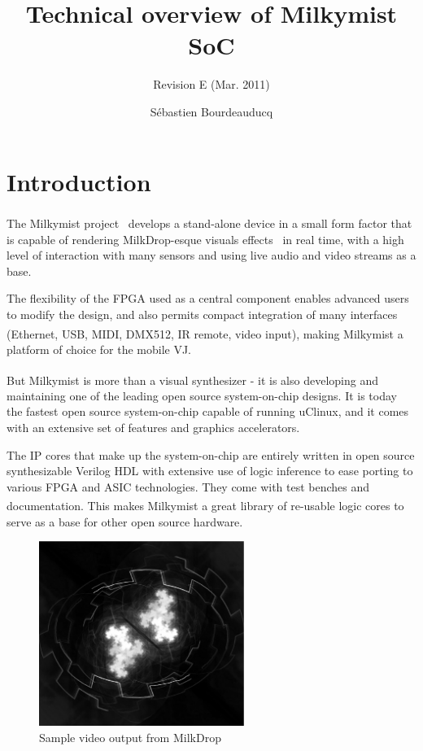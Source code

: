 \documentclass[a4paper,11pt,twocolumn]{paper}
\title{Technical overview of Milkymist SoC}
\subtitle{Revision E (Mar. 2011)}
\author{S\'ebastien Bourdeauducq}
\begin{document}
\maketitle{}
\section{Introduction}
The Milkymist\textsuperscript{\texttrademark} project~\cite{milkymist} develops a stand-alone device in a small form factor that is capable of rendering MilkDrop-esque visuals effects~\cite{milkdrop} in real time, with a high level of interaction with many sensors and using live audio and video streams as a base.

The flexibility of the FPGA used as a central component enables advanced users to modify the design, and also permits compact integration of many interfaces (Ethernet, USB, MIDI, DMX512, IR remote, video input), making Milkymist\textsuperscript{\texttrademark} a platform of choice for the mobile VJ.

But Milkymist\textsuperscript{\texttrademark} is more than a visual synthesizer - it is also developing and maintaining one of the leading open source system-on-chip designs. It is today the fastest open source system-on-chip capable of running uClinux, and it comes with an extensive set of features and graphics accelerators.

The IP cores that make up the system-on-chip are entirely written in open source synthesizable Verilog HDL with extensive use of logic inference to ease porting to various FPGA and ASIC technologies. They come with test benches and documentation. This makes Milkymist\textsuperscript{\texttrademark} a great library of re-usable logic cores to serve as a base for other open source hardware.

\begin{figure}
\centering
\includegraphics[height=60mm]{milkdrop_bw.eps}
\caption{Sample video output from MilkDrop}
\label{fig:genodefx}
\end{figure}
\end{document}
